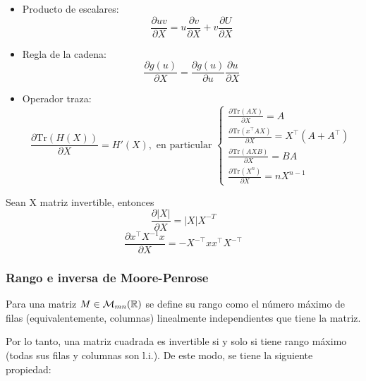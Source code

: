 \begin{itemize}
	\item Producto de escalares:
	\begin{equation}
		\frac{\partial uv}{\partial X} = u\frac{\partial v}{\partial X} + v\frac{\partial U}{\partial X}
	\end{equation}
	
	\item Regla de la cadena:
	\begin{equation}
		\frac{\partial g(u)}{\partial X} = \frac{\partial g(u)}{\partial u} \frac{\partial u}{\partial X}
	\end{equation}
	
	\item Operador traza:
	\begin{equation}
		\frac{\partial \text{Tr}(H(X))}{\partial X} = H'(X),	\text{ en particular } \begin{cases}
			\frac{\partial \text{Tr}(AX)}{\partial X} = A\\
			\frac{\partial \text{Tr}(x^\top A X)}{\partial X} = X^\top(A+A^\top)\\
			\frac{\partial \text{Tr}(AXB)}{\partial X} = BA\\
			\frac{\partial \text{Tr}(X^n)}{\partial X} = nX^{n-1}
		\end{cases}
		\end{equation}
\end{itemize}

Sean X matriz invertible, entonces 
\begin{equation}
\frac{\partial |X|}{\partial X} = |X|X^{-T} 
\end{equation}
\begin{equation}
\frac{\partial x^\top X^{-1} x }{\partial X} = -X^{-\top}xx^\top X^{-\top}
\end{equation}

\subsubsection{Rango e inversa de Moore-Penrose}

\begin{definition}[rango]
	Para una matriz $M\in\mathcal{M}_{mn}(\mathbb{R})$ se define su rango como el número máximo de filas (equivalentemente, columnas) linealmente independientes que tiene la matriz.
\end{definition}

Por lo tanto, una matriz cuadrada es invertible si y solo si tiene rango máximo (todas sus filas y columnas son l.i.). De este modo, se tiene la siguiente propiedad:

